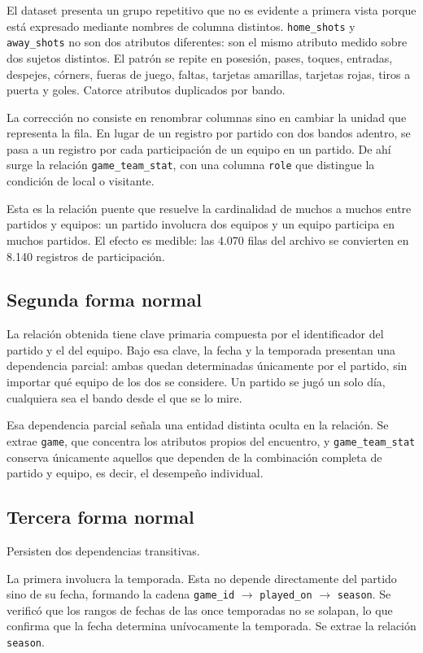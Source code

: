 \documentclass[conference]{IEEEtran}
\begin{document}
El dataset presenta un grupo repetitivo que no es evidente a primera vista
porque está expresado mediante nombres de columna distintos.
\texttt{home\_shots} y \texttt{away\_shots} no son dos atributos diferentes:
son el mismo atributo medido sobre dos sujetos distintos. El patrón se repite
en posesión, pases, toques, entradas, despejes, córners, fueras de juego,
faltas, tarjetas amarillas, tarjetas rojas, tiros a puerta y goles. Catorce
atributos duplicados por bando.

La corrección no consiste en renombrar columnas sino en cambiar la unidad que
representa la fila. En lugar de un registro por partido con dos bandos adentro,
se pasa a un registro por cada participación de un equipo en un partido. De ahí
surge la relación \texttt{game\_team\_stat}, con una columna \texttt{role} que
distingue la condición de local o visitante.

Esta es la relación puente que resuelve la cardinalidad de muchos a muchos
entre partidos y equipos: un partido involucra dos equipos y un equipo
participa en muchos partidos. El efecto es medible: las 4.070 filas del archivo
se convierten en 8.140 registros de participación.

\subsection{Segunda forma normal}

La relación obtenida tiene clave primaria compuesta por el identificador del
partido y el del equipo. Bajo esa clave, la fecha y la temporada presentan una
dependencia parcial: ambas quedan determinadas únicamente por el partido, sin
importar qué equipo de los dos se considere. Un partido se jugó un solo día,
cualquiera sea el bando desde el que se lo mire.

Esa dependencia parcial señala una entidad distinta oculta en la relación. Se
extrae \texttt{game}, que concentra los atributos propios del encuentro, y
\texttt{game\_team\_stat} conserva únicamente aquellos que dependen de la
combinación completa de partido y equipo, es decir, el desempeño individual.

\subsection{Tercera forma normal}

Persisten dos dependencias transitivas.

La primera involucra la temporada. Esta no depende directamente del partido
sino de su fecha, formando la cadena \texttt{game\_id} $\rightarrow$
\texttt{played\_on} $\rightarrow$ \texttt{season}. Se verificó que los rangos
de fechas de las once temporadas no se solapan, lo que confirma que la fecha
determina unívocamente la temporada. Se extrae la relación \texttt{season}.
\end{document}
